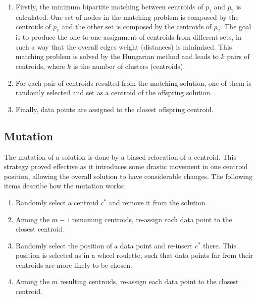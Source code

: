 \begin{enumerate}
	\item Firstly, the minimum bipartite matching between centroids of $p_1$ and $p_2$ is calculated. One set of nodes in the matching problem is composed by the centroids of $p_1$ and the other set is composed by the centroids of $p_2$. The goal is to produce the one-to-one assignment of centroids from different sets, in such a way that the overall edges weight (distances) is minimized. This matching problem is solved by the Hungarian method and leads to $k$ pairs of centroids, where $k$ is the number of clusters (centroids).

	\item For each pair of centroids resulted from the matching solution, one of them is randomly selected and set as a centroid of the offspring solution.

	\item Finally, data points are assigned to the closest offspring centroid.
\end{enumerate}

\subsection{Mutation}
The mutation of a solution is done by a biased relocation of a centroid. This strategy proved effective as it introduces some drastic movement in one centroid position, allowing the overall solution to have considerable changes. The following items describe how the mutation works:

\begin{enumerate}

	\item Randomly select a centroid $c^{*}$ and remove it from the solution.
	
	\item Among the $m-1$ remaining centroids, re-assign each data point to the closest centroid.
	
	\item Randomly select the position of a data point and re-insert $c^{*}$ there. This position is selected as in a wheel roulette, such that data points far from their centroids are more likely to be chosen.
	
	\item Among the $m$ resulting centroids, re-assign each data point to the closest centroid.
		
\end{enumerate}

